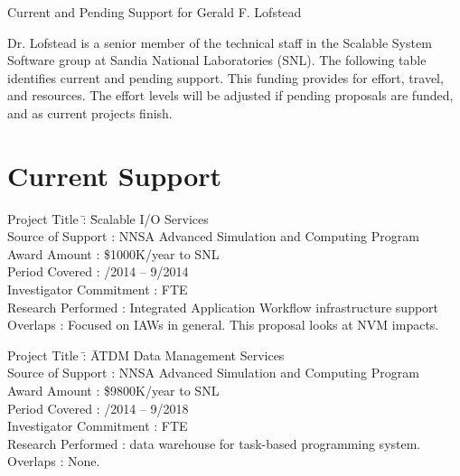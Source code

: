 \documentclass[10pt]{article}
\begin{document}
\begin{center}
{\Large Current and Pending Support for Gerald F. Lofstead}
\end{center}


Dr. Lofstead is a senior member of the technical staff in the Scalable
System Software group at Sandia National Laboratories (SNL). The following
table identifies current and pending support. This funding provides for effort,
travel, and resources. The effort levels will be adjusted if pending proposals
are funded, and as current projects finish.


\section*{Current Support}

\begin{tabbing}
Project Title \hspace{5.5em}\=: \= Scalable I/O Services\\
Source of Support           \>: \> NNSA Advanced Simulation and Computing Program\\
Award Amount                \>: \> \$1000K/year to SNL\\
Period Covered              \>: /2014 -- 9/2014\\
Investigator Commitment     \>:  FTE\\
Research Performed          \>: \> Integrated Application Workflow infrastructure support\\
Overlaps                    \>: \> Focused on IAWs in general. This proposal looks at NVM impacts.\\
\end{tabbing}

\begin{tabbing}
Project Title \hspace{5.5em}\=: \= ATDM Data Management Services\\
Source of Support           \>: \> NNSA Advanced Simulation and Computing Program\\
Award Amount                \>: \> \$9800K/year to SNL\\
Period Covered              \>: /2014 -- 9/2018\\
Investigator Commitment     \>:  FTE\\
Research Performed          \>: \> data warehouse for task-based programming system.\\
Overlaps                    \>: \> None.\\
\end{tabbing}
\end{document}

